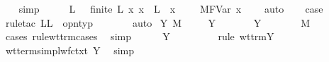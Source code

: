 \begin{isabellebody}
\ \ \isamarkupfalse%
\ simp\isanewline
\ \ \isamarkupfalse%
\ \isamarkupfalse%
\ L\ \ {}{\isacharcolon}\ {\isachardoublequoteopen}finite\ L{\isachardoublequoteclose}\ {\isachardoublequoteopen}{\isasymAnd}x{\isachardot}\ x\ {\isasymnotin}\ L\ {\isasymLongrightarrow}\ {\isacharparenleft}x{\isacharcomma}\ {\isasymtau}{\isacharparenright}\ {\isacharhash}\ {\isasymGamma}\ {\isasymturnstile}\ M{\isacharcircum}FVar\ x\ {\isacharcolon}\ {\isasymsigma}{\isachardoublequoteclose}\ \isamarkupfalse%
\ auto\isanewline
\isanewline
\ \ \isamarkupfalse%
\ {\isacharquery}case\isanewline
\ \ \isamarkupfalse%
\ {\isacharparenleft}rule{\isacharunderscore}tac\ L{\isacharequal}L\ \ opn{\isacharunderscore}typ{\isacharparenright}\isanewline
\ \ \isamarkupfalse%
\ {}\ {}{\isacharparenleft}{}{\isacharparenright}\ \isamarkupfalse%
\ auto\isanewline
{}\isamarkupfalse%
\isanewline
{}\isamarkupfalse%
\ {\isacharparenleft}Y\ M\ {\isasymtau}{\isacharparenright}\isanewline
\ \ \isamarkupfalse%
\ Y{\isacharparenleft}{}{\isacharparenright}\ \isamarkupfalse%
\ {\isasympi}\ \ {}{\isacharcolon}\ {\isachardoublequoteopen}{\isasymGamma}\ {\isasymturnstile}\ {\isacharparenleft}Y\ {\isasymtau}{\isacharparenright}\ {\isacharcolon}\ {\isasympi}\ {\isasymrightarrow}\ {\isasymsigma}{\isachardoublequoteclose}\ {\isachardoublequoteopen}{\isasymGamma}\ {\isasymturnstile}\ M\ {\isacharcolon}\ {\isasympi}{\isachardoublequoteclose}\ \isanewline
\ \ \ \ \isamarkupfalse%
\ {\isacharparenleft}cases\ rule{\isacharcolon}wt{\isacharunderscore}trm{\isachardot}cases{\isacharparenright}\ \isamarkupfalse%
\ simp\isanewline
\ \ \isamarkupfalse%
\ {\isachardoublequoteopen}{\isasymGamma}\ {\isasymturnstile}\ {\isacharparenleft}Y\ {\isasymtau}{\isacharparenright}\ {\isacharcolon}\ {\isacharparenleft}{\isasymtau}\ {\isasymrightarrow}\ {\isasymtau}{\isacharparenright}\ {\isasymrightarrow}\ {\isasymtau}{\isachardoublequoteclose}\ \isamarkupfalse%
\ {\isacharparenleft}rule\ wt{\isacharunderscore}trm{\isachardot}Y{\isacharparenright}\isanewline
\ \ \ \ \isamarkupfalse%
\ wt{\isacharunderscore}terms{\isacharunderscore}impl{\isacharunderscore}wf{\isacharunderscore}ctxt\ Y\ \isamarkupfalse%
\ simp\isanewline
\ \ \isamarkupfalse%

\end{isabellebody}
